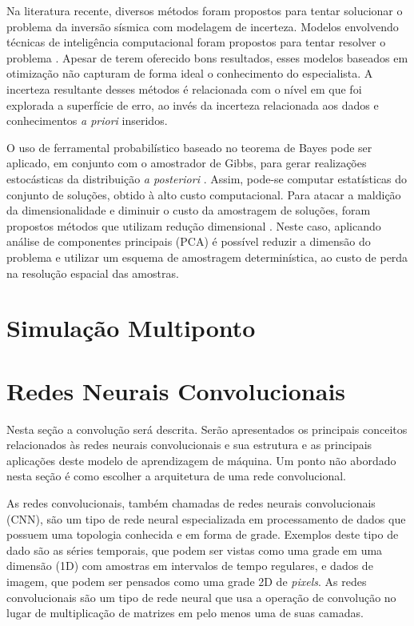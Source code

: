 
 Na literatura recente, diversos métodos foram propostos para tentar solucionar
 o problema da inversão sísmica com modelagem de incerteza.
Modelos envolvendo técnicas de inteligência computacional foram propostos para
tentar resolver o problema
\citep{senSimulatedAnnealin,MallickGeneticInve,max_inv_simulated,Artun2011143,MartinezPSO,Sambridge22102013}.
Apesar de terem oferecido bons resultados, esses modelos baseados em otimização
não capturam de forma ideal o conhecimento do especialista. A incerteza
resultante desses métodos é relacionada com o nível em que foi explorada a
superfície de erro, ao invés da incerteza relacionada aos dados e conhecimentos
\textit{a priori} inseridos.

O uso de ferramental probabilístico baseado no teorema de Bayes pode ser
aplicado, em conjunto com o amostrador de Gibbs, para gerar realizações
estocásticas da distribuição \textit{a posteriori} \citep{leandro_SEG}. Assim,
pode-se computar estatísticas do conjunto de soluções, obtido à alto custo
computacional. Para atacar a maldição da dimensionalidade e diminuir o custo da
amostragem de soluções, foram propostos métodos que utilizam redução dimensional
\citep{TompkinsScalabUnce2011}. Neste caso, aplicando análise de componentes
principais (PCA) é possível reduzir a dimensão do problema e utilizar um esquema
de amostragem determinística, ao custo de perda na resolução espacial das
amostras.

\section{Simulação Multiponto}



\section{Redes Neurais Convolucionais}
Nesta seção a convolução será descrita. Serão apresentados os principais conceitos relacionados às redes
neurais convolucionais e sua estrutura e as principais
aplicações deste modelo de aprendizagem de máquina. Um ponto não abordado nesta seção é
como escolher a arquitetura de uma rede convolucional.

As redes convolucionais, também chamadas de redes neurais convolucionais (CNN),
são um tipo de rede neural especializada em processamento de dados que possuem uma
topologia conhecida e em forma de grade. Exemplos deste tipo de dado são as séries
temporais, que podem ser vistas como uma grade em uma dimensão (1D) com amostras
em intervalos de tempo regulares, e dados de imagem, que podem ser pensados como
uma grade 2D de \textit{pixels}. As redes convolucionais são um tipo de rede neural
que usa a operação de convolução no lugar de multiplicação de matrizes em pelo menos uma
de suas camadas.

